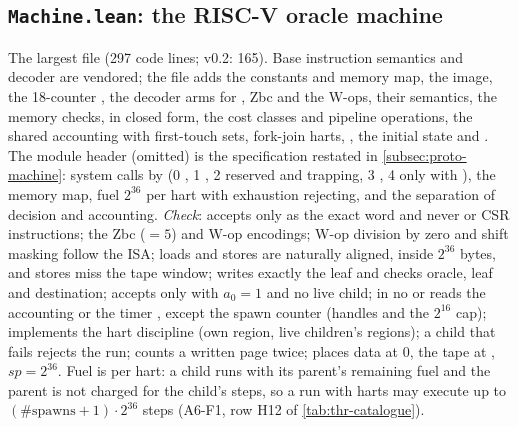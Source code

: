 \subsection{\texttt{Machine.lean}: the RISC-V oracle machine}

The largest file (297 code lines; v0.2: 165). Base instruction semantics and decoder are vendored;
the file adds the constants and memory map, the image, the 18-counter , the decoder
arms for , Zbc and the W-ops, their semantics, the memory checks,  in
closed form, the cost classes and pipeline operations, the shared accounting with first-touch
sets, fork-join harts, , the initial state and . The module header
(omitted) is the specification restated in \cref{subsec:proto-machine}: system calls by 
(0 , 1 , 2  reserved and trapping, 3 , 4 
only with ), the memory map, fuel $2^{36}$ per hart with exhaustion rejecting, and
the separation of decision and accounting. \emph{Check}:  accepts
 only as the exact word and never  or CSR instructions; the Zbc
(${}=5$) and W-op encodings; W-op division by zero and shift masking follow the ISA;
loads and stores are naturally aligned, inside $2^{36}$ bytes, and stores miss the tape window;
 writes exactly the leaf and checks oracle, leaf and destination;  accepts
only with $a_0=1$ and no live child; in  no  or  reads the
accounting  or the timer , except the spawn counter  (handles and
the $2^{16}$ cap);  implements the hart discipline (own region, live children's
regions); a child that fails rejects the run;  counts a written page twice;
 places data at 0, the tape at , $\mathit{sp}=2^{36}$. Fuel is per
hart: a child runs with its parent's remaining fuel and the parent is not charged for the child's
steps, so a run with harts may execute up to $(\#\mathrm{spawns}+1)\cdot2^{36}$ steps (A6-F1,
row H12 of \cref{tab:thr-catalogue}).

